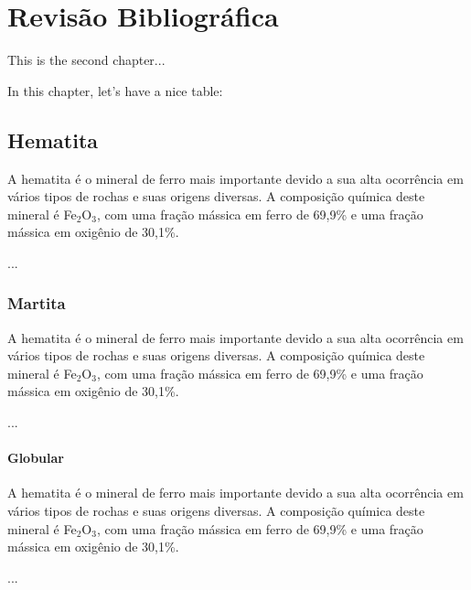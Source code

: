 
\chapter{Revisão Bibliográfica}

This is the second chapter...

In this chapter, let's have a nice table:

%


\section{Hematita}

A hematita é o mineral de ferro mais importante devido a sua alta
ocorrência em vários tipos de rochas e suas origens diversas.\cite{30}
A composição química deste mineral é Fe$_{2}$O$_{3}$, com uma fração
mássica em ferro de 69,9\% e uma fração mássica em oxigênio de
30,1\%.\cite{31}

...


\subsection{Martita}

A hematita é o mineral de ferro mais importante devido a sua alta
ocorrência em vários tipos de rochas e suas origens diversas.\cite{30}
A composição química deste mineral é Fe$_{2}$O$_{3}$, com uma fração
mássica em ferro de 69,9\% e uma fração mássica em oxigênio de
30,1\%.\cite{31}

...


\subsubsection{Globular}

A hematita é o mineral de ferro mais importante devido a sua alta
ocorrência em vários tipos de rochas e suas origens diversas.\cite{30}
A composição química deste mineral é Fe$_{2}$O$_{3}$, com uma fração
mássica em ferro de 69,9\% e uma fração mássica em oxigênio de
30,1\%.\cite{31}

...
